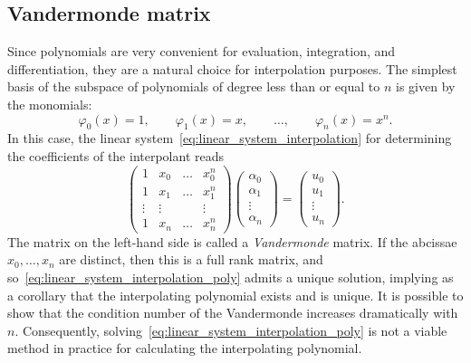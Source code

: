 \subsection{Vandermonde matrix}
Since polynomials are very convenient for evaluation, integration, and differentiation,
they are a natural choice for interpolation purposes.
The simplest basis of the subspace of polynomials of degree less than or equal to $n$ is given by the monomials:
\[
    \varphi_0(x) = 1,
    \qquad
    \varphi_1(x) = x,
    \qquad \dotsc, \qquad
    \varphi_n(x) = x^n.
\]
In this case,
the linear system~\eqref{eq:linear_system_interpolation} for determining the coefficients of the interpolant reads
\begin{equation}
    \label{eq:linear_system_interpolation_poly}
    \begin{pmatrix}
        1 & x_0 & \hdots & x_0^n \\
        1 & x_1 & \hdots & x_1^n \\
        \vdots & \vdots & & \vdots \\
        1 & x_n & \hdots & x_n^n
    \end{pmatrix}
    \begin{pmatrix}
        \alpha_0 \\
        \alpha_1 \\
        \vdots \\
        \alpha_n
    \end{pmatrix}
    =
    \begin{pmatrix}
        u_0 \\
        u_1 \\
        \vdots \\
        u_n
    \end{pmatrix}.
\end{equation}
The matrix on the left-hand side is called a \emph{Vandermonde} matrix.
If the abcissae $x_0, \dotsc, x_n$ are distinct,
then this is a full rank matrix,
and so~\eqref{eq:linear_system_interpolation_poly} admits a unique solution,
implying as a corollary that the interpolating polynomial exists and is unique.
It is possible to show that the condition number of the Vandermonde increases dramatically with $n$.
Consequently, solving~\eqref{eq:linear_system_interpolation_poly} is not a viable method in practice for calculating the interpolating polynomial.

